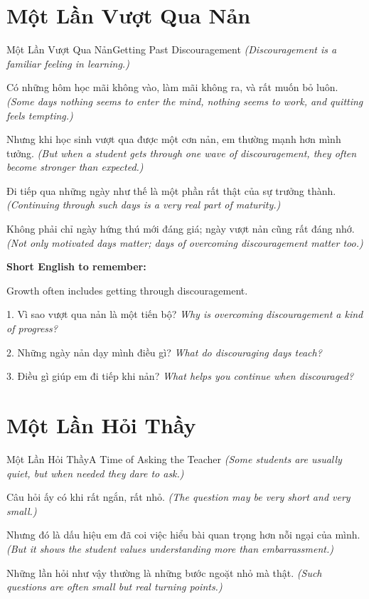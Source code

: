 \section{Một Lần Vượt Qua Nản}
\begin{truyen}{Một Lần Vượt Qua Nản}{Getting Past Discouragement}
\textit{(Discouragement is a familiar feeling in learning.)}

Có những hôm học mãi không vào, làm mãi không ra, và rất muốn bỏ luôn.
\textit{(Some days nothing seems to enter the mind, nothing seems to work, and quitting feels tempting.)}

Nhưng khi học sinh vượt qua được một cơn nản, em thường mạnh hơn mình tưởng.
\textit{(But when a student gets through one wave of discouragement, they often become stronger than expected.)}

Đi tiếp qua những ngày như thế là một phần rất thật của sự trưởng thành.
\textit{(Continuing through such days is a very real part of maturity.)}
\end{truyen}

\begin{baihoc}
Không phải chỉ ngày hứng thú mới đáng giá; ngày vượt nản cũng rất đáng nhớ.
\textit{(Not only motivated days matter; days of overcoming discouragement matter too.)}
\end{baihoc}

\begin{ghinhoanh}
\textbf{Short English to remember:}

Growth often includes getting through discouragement.

\end{ghinhoanh}

\begin{tuhocnhanh}
1. Vì sao vượt qua nản là một tiến bộ? \textit{Why is overcoming discouragement a kind of progress?}

2. Những ngày nản dạy mình điều gì? \textit{What do discouraging days teach?}

3. Điều gì giúp em đi tiếp khi nản? \textit{What helps you continue when discouraged?}
\end{tuhocnhanh}
\ngancach

\section{Một Lần Hỏi Thầy}
\begin{truyen}{Một Lần Hỏi Thầy}{A Time of Asking the Teacher}
\textit{(Some students are usually quiet, but when needed they dare to ask.)}

Câu hỏi ấy có khi rất ngắn, rất nhỏ.
\textit{(The question may be very short and very small.)}

Nhưng đó là dấu hiệu em đã coi việc hiểu bài quan trọng hơn nỗi ngại của mình.
\textit{(But it shows the student values understanding more than embarrassment.)}

Những lần hỏi như vậy thường là những bước ngoặt nhỏ mà thật.
\textit{(Such questions are often small but real turning points.)}
\end{truyen}

